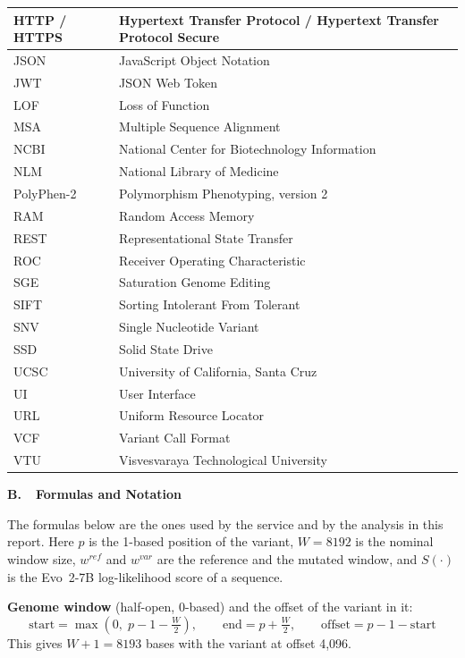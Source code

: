 \begin{longtable}{|p{110pt}|p{343pt}|}
\hline HTTP / HTTPS & Hypertext Transfer Protocol / Hypertext Transfer Protocol Secure\\
\hline JSON & JavaScript Object Notation\\
\hline JWT & JSON Web Token\\
\hline LOF & Loss of Function\\
\hline MSA & Multiple Sequence Alignment\\
\hline NCBI & National Center for Biotechnology Information\\
\hline NLM & National Library of Medicine\\
\hline PolyPhen-2 & Polymorphism Phenotyping, version 2\\
\hline RAM & Random Access Memory\\
\hline REST & Representational State Transfer\\
\hline ROC & Receiver Operating Characteristic\\
\hline SGE & Saturation Genome Editing\\
\hline SIFT & Sorting Intolerant From Tolerant\\
\hline SNV & Single Nucleotide Variant\\
\hline SSD & Solid State Drive\\
\hline UCSC & University of California, Santa Cruz\\
\hline UI & User Interface\\
\hline URL & Uniform Resource Locator\\
\hline VCF & Variant Call Format\\
\hline VTU & Visvesvaraya Technological University\\
\hline
\end{longtable}
\endgroup
\clearpage
{\fontsize{14}{16}\selectfont\bfseries B.\ \ Formulas and Notation}\par\vspace{4pt}
\begingroup
\fontsize{12}{14}\selectfont\renewcommand{\baselinestretch}{1.15}\selectfont\setlength{\parskip}{4pt}
\renewcommand{\theequation}{A.\arabic{equation}}\setcounter{equation}{0}
The formulas below are the ones used by the service and by the analysis in this report. Here $p$ is the 1-based position of the variant, $W=8192$ is the nominal window size, $w^{ref}$ and $w^{var}$ are the reference and the mutated window, and $S(\cdot)$ is the Evo~2-7B log-likelihood score of a sequence.

\textbf{Genome window} (half-open, 0-based) and the offset of the variant in it:
\begin{equation}\mathrm{start}=\max\!\left(0,\;p-1-\tfrac{W}{2}\right),\qquad \mathrm{end}=p+\tfrac{W}{2},\qquad \mathrm{offset}=p-1-\mathrm{start}\end{equation}
This gives $W+1=8193$ bases with the variant at offset 4,096.

